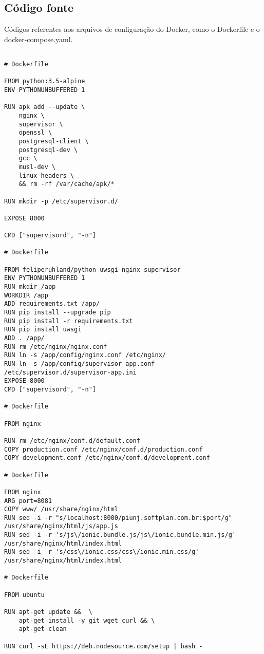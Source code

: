 \documentclass[
	12pt,				%
	openright,			%
	oneside,			%
	a4paper,			%
	chapter=TITLE,		%
	section=TITLE,		%
	english,			%
	french,				%
	spanish,			%
	brazil				%
	]{abntex2}
\begin{document}
\begin{apendicesenv}

\chapter{Código fonte}
Códigos referentes aos arquivos de configuração do Docker, como o Dockerfile e o docker-compose.yaml.

\scriptsize
\begin{lstlisting}

# Dockerfile

FROM python:3.5-alpine
ENV PYTHONUNBUFFERED 1

RUN apk add --update \
	nginx \
	supervisor \
	openssl \
	postgresql-client \
	postgresql-dev \
	gcc \
	musl-dev \
	linux-headers \
	&& rm -rf /var/cache/apk/*

RUN mkdir -p /etc/supervisor.d/

EXPOSE 8000

CMD ["supervisord", "-n"]

# Dockerfile

FROM feliperuhland/python-uwsgi-nginx-supervisor
ENV PYTHONUNBUFFERED 1
RUN mkdir /app
WORKDIR /app
ADD requirements.txt /app/
RUN pip install --upgrade pip
RUN pip install -r requirements.txt
RUN pip install uwsgi
ADD . /app/
RUN rm /etc/nginx/nginx.conf
RUN ln -s /app/config/nginx.conf /etc/nginx/
RUN ln -s /app/config/supervisor-app.conf /etc/supervisor.d/supervisor-app.ini
EXPOSE 8000
CMD ["supervisord", "-n"]

# Dockerfile

FROM nginx

RUN rm /etc/nginx/conf.d/default.conf
COPY production.conf /etc/nginx/conf.d/production.conf
COPY development.conf /etc/nginx/conf.d/development.conf

# Dockerfile

FROM nginx
ARG port=8081
COPY www/ /usr/share/nginx/html
RUN sed -i -r "s/localhost:8000/piunj.softplan.com.br:$port/g" /usr/share/nginx/html/js/app.js
RUN sed -i -r 's/js\/ionic.bundle.js/js\/ionic.bundle.min.js/g' /usr/share/nginx/html/index.html
RUN sed -i -r 's/css\/ionic.css/css\/ionic.min.css/g' /usr/share/nginx/html/index.html

# Dockerfile

FROM ubuntu

RUN apt-get update &&  \
    apt-get install -y git wget curl && \
    apt-get clean

RUN curl -sL https://deb.nodesource.com/setup | bash -


\end{lstlisting}
\end{apendicesenv}
\end{document}
